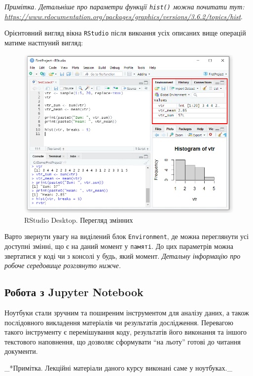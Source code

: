 \documentclass[
]{book}
\begin{document}
\emph{Примітка. Детальніше про параметри функції \texttt{hist()} можна почитати тут: \url{https://www.rdocumentation.org/packages/graphics/versions/3.6.2/topics/hist}}.

Орієнтовний вигляд вікна \texttt{RStudio} після викоання усіх описаних вище операцій матиме настпуний вигляд:

\begin{figure}
\centering
\includegraphics{images/chapter1/rstudio_10.png}
\caption{\label{fig:unnamed-chunk-23}RStudio Desktop. Перегляд змінних}
\end{figure}

Варто звернути увагу на виділений блок \texttt{Environment}, де можна переглянути усі доступні змінні, що є на даний момент у \texttt{пам\textquotesingle{}яті}. До цих параметрів можна звертатися у коді чи з консолі у будь, який момент. \emph{Детальну інформацію про робоче середовище розглянуто нижче.}

\hypertarget{chapter133}{%
\subsection{Робота з Jupyter Notebook}\label{chapter133}}

Ноутбуки стали зручним та поширеним інструментом для аналізу даних, а також послідовного викладення матеріалів чи результатів дослідження. Перевагою такого інструменту є перемішування коду, результатів його виконання та іншого текстового наповнення, що дозволяє сформувати ``на льоту'' готові до читання документи.

\_*Примітка. Лекційні матеріали даного курсу виконані саме у ноутбуках.\_
\end{document}
